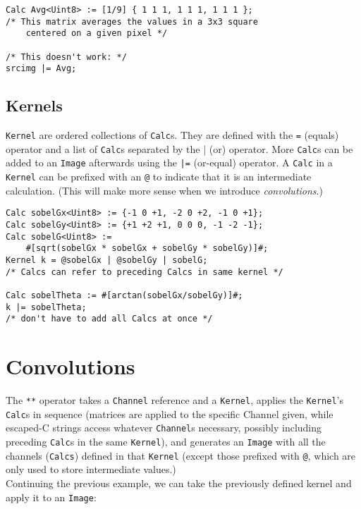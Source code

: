 \begin{lstlisting}[language=CLAM,escapechar=\%]
Calc Avg<Uint8> := [1/9] { 1 1 1, 1 1 1, 1 1 1 };
/* This matrix averages the values in a 3x3 square
	centered on a given pixel */

/* This doesn't work: */
srcimg |= Avg;
\end{lstlisting}

\subsection{Kernels}

\texttt{Kernel} are ordered collections of \texttt{Calc}s. They are defined with the \texttt{=} (equals) operator
and a list of \texttt{Calc}s separated by the | (or) operator. More \texttt{Calc}s can be added to
an \texttt{Image} afterwards using the \texttt{|=} (or-equal) operator. A \texttt{Calc} in a \texttt{Kernel}
can be prefixed with an \texttt{@} to indicate that it is an intermediate calculation. (This will make
more sense when we introduce \emph{convolutions}.)

\begin{lstlisting}[language=CLAM,escapechar=\%]
Calc sobelGx<Uint8> := {-1 0 +1, -2 0 +2, -1 0 +1};
Calc sobelGy<Uint8> := {+1 +2 +1, 0 0 0, -1 -2 -1};
Calc sobelG<Uint8> := 
    #[sqrt(sobelGx * sobelGx + sobelGy * sobelGy)]#;
Kernel k = @sobelGx | @sobelGy | sobelG;
/* Calcs can refer to preceding Calcs in same kernel */

Calc sobelTheta := #[arctan(sobelGx/sobelGy)]#;
k |= sobelTheta; 
/* don't have to add all Calcs at once */
\end{lstlisting}

\section{Convolutions}

The \texttt{**} operator takes a \texttt{Channel} reference and a \texttt{Kernel},
applies the \texttt{Kernel}'s \texttt{Calc}s in sequence (matrices are applied to the specific Channel given,
while escaped-C strings access whatever \texttt{Channel}s necessary, possibly including preceding \texttt{Calc}s
in the same \texttt{Kernel}),
and generates an \texttt{Image} with all the channels (\texttt{Calcs}) defined in that \texttt{Kernel} (except those prefixed with \texttt{@},
which are only used to store intermediate values.)\\

Continuing the previous example, we can take the previously defined kernel and apply it to an \texttt{Image}:\\

